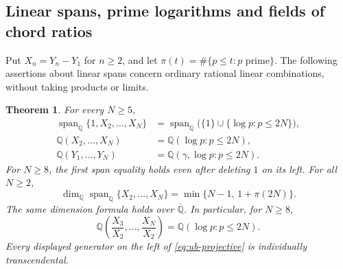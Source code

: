\documentclass[11pt,a4paper]{article}
\newtheorem{theorem}{Theorem}[section]
\theoremstyle{definition}\newtheorem{definition}[theorem]{Definition}\newtheorem{example}[theorem]{Example}
\theoremstyle{remark}\newtheorem{remark}[theorem]{Remark}
\newcommand{\Q}{\mathbb Q}\newcommand{\Z}{\mathbb Z}\newcommand{\R}{\mathbb R}\newcommand{\N}{\mathbb N}
\begin{document}
\subsection{Linear spans, prime logarithms and fields of chord ratios}

Put $X_n=Y_n-Y_1$ for $n\ge2$, and let
$\pi(t)=\#\{p\le t:p\text{ prime}\}$. The following assertions about
linear spans concern ordinary rational linear combinations, without
taking products or limits.

\begin{theorem}
\label{thm:ub-rank}
For every $N\ge5$,
\begin{align*}
 \operatorname{span}_{\Q}\{1,X_2,\ldots,X_N\}
  &=\operatorname{span}_{\Q}\bigl(\{1\}\cup\{\log p:p\le2N\}\bigr),\\
 \Q(X_2,\ldots,X_N)&=\Q(\log p:p\le2N),\\
 \Q(Y_1,\ldots,Y_N)&=\Q(\gamma,\log p:p\le 2N).
\end{align*}
For $N\ge8$, the first span equality holds even after deleting
$1$ on its left. For all $N\ge2$,
\begin{equation}
 \dim_{\Q}\operatorname{span}_{\Q}\{X_2,\ldots,X_N\}
    =\min\{N-1,\,1+\pi(2N)\}.
 \label{eq:ub-dim}
\end{equation}
The same dimension formula holds over $\overline{\Q}$. In
particular, for $N\ge8$,
\begin{equation}
 \Q\left(\frac{X_3}{X_2},\ldots,\frac{X_N}{X_2}\right)
     =\Q(\log p:p\le 2N).
 \label{eq:ub-projective}
\end{equation}
Every displayed generator on the left of \eqref{eq:ub-projective}
is individually transcendental.
\end{theorem}
\end{document}
